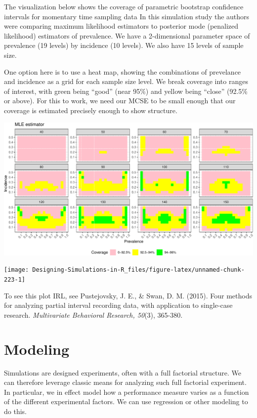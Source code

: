 \documentclass[
]{book}
\begin{document}
The visualization below shows the coverage of parametric bootstrap confidence intervals for momentary time sampling data
In this simulation study the authors were comparing maximum likelihood estimators to posterior mode (penalized likelihood) estimators of prevalence.
We have a 2-dimensional parameter space of prevalence (19 levels) by incidence (10 levels).
We also have 15 levels of sample size.

One option here is to use a heat map, showing the combinations of prevelance and incidence as a grid for each sample size level.
We break coverage into ranges of interest, with green being ``good'' (near 95\%) and yellow being ``close'' (92.5\% or above).
For this to work, we need our MCSE to be small enough that our coverage is estimated precisely enough to show structure.

\begin{center}\includegraphics[width=0.75\linewidth]{Designing-Simulations-in-R_files/figure-latex/swan_example_setup-1} \end{center}

\begin{center}\texttt{[image: Designing-Simulations-in-R\_files/figure-latex/unnamed-chunk-223-1]} \end{center}

To see this plot IRL, see Pustejovsky, J. E., \& Swan, D. M. (2015). Four methods for analyzing partial interval recording data, with application to single-case research. \emph{Multivariate Behavioral Research, 50}(3), 365-380.

\hypertarget{modeling}{%
\section{Modeling}\label{modeling}}

Simulations are designed experiments, often with a full factorial structure.
We can therefore leverage classic means for analyzing such full factorial experiment.
In particular, we in effect model how a performance measure varies as a function of the different experimental factors.
We can use regression or other modeling to do this.
\end{document}

